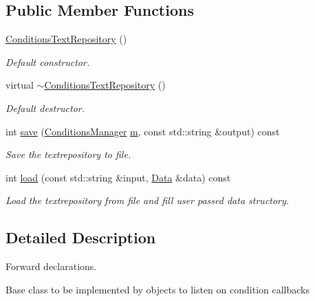 \subsection*{Public Member Functions}
\begin{DoxyCompactItemize}
\item 
\hyperlink{class_d_d4hep_1_1_conditions_1_1_conditions_text_repository_ae00798ba3a2736978fc0b9c3a9325abe}{Conditions\+Text\+Repository} ()
\begin{DoxyCompactList}\small\item\em Default constructor. \end{DoxyCompactList}\item 
virtual \hyperlink{class_d_d4hep_1_1_conditions_1_1_conditions_text_repository_af70e49d05e4819f28d4516fab871bd69}{$\sim$\+Conditions\+Text\+Repository} ()
\begin{DoxyCompactList}\small\item\em Default destructor. \end{DoxyCompactList}\item 
int \hyperlink{class_d_d4hep_1_1_conditions_1_1_conditions_text_repository_a49a8e0cd212ea286f16c2a600d7da048}{save} (\hyperlink{class_d_d4hep_1_1_conditions_1_1_conditions_manager}{Conditions\+Manager} \hyperlink{_volumes_8cpp_a6fc379aaec47ce424b00d8ffda2a6c59}{m}, const std\+::string \&output) const
\begin{DoxyCompactList}\small\item\em Save the textrepository to file. \end{DoxyCompactList}\item 
int \hyperlink{class_d_d4hep_1_1_conditions_1_1_conditions_text_repository_ad86a6e20ad5937702cad0cd98f3e19e8}{load} (const std\+::string \&input, \hyperlink{class_d_d4hep_1_1_conditions_1_1_conditions_text_repository_afe5d8989bf0bcd711e59f838943b5115}{Data} \&data) const
\begin{DoxyCompactList}\small\item\em Load the textrepository from file and fill user passed data structory. \end{DoxyCompactList}\end{DoxyCompactItemize}


\subsection{Detailed Description}
Forward declarations. 

Base class to be implemented by objects to listen on condition callbacks

